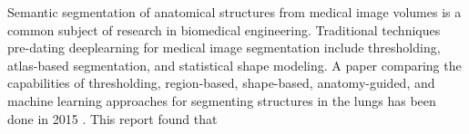 
Semantic segmentation of anatomical structures from medical image volumes is a common subject of research in biomedical engineering. Traditional techniques pre-dating deeplearning for medical image segmentation include thresholding, atlas-based segmentation, and statistical shape modeling. A paper comparing the capabilities of thresholding, region-based, shape-based, anatomy-guided, and machine learning approaches for segmenting structures in the lungs has been done in 2015 \cite{comparison:article_typical}. This report found that